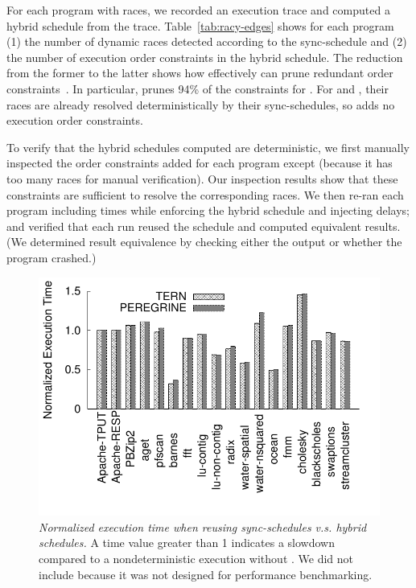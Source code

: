 For each program with races, we recorded an execution trace and computed a
hybrid schedule from the trace.  Table~\ref{tab:racy-edges} shows for each
program (1) the number of dynamic races detected according to the
sync-schedule and (2) the number of execution order constraints in the
hybrid schedule.  The reduction from the former to the latter shows how
effectively \peregrine can prune redundant order constraints~\cite{peregrine:sosp11}.
In particular, \peregrine prunes 94\% of the constraints
for \racey.  For \apache and
\streamcluster, their races are already resolved deterministically by
their sync-schedules, so \peregrine adds no execution order
constraints.

To verify that the hybrid schedules \peregrine computed are deterministic, we
first manually inspected the order constraints \peregrine added for each program
except \racey (because it has too many races for manual verification).  Our
inspection results show that these constraints are sufficient to resolve
the corresponding races.  We then re-ran each program including 
times while enforcing the hybrid schedule and injecting delays; 
and verified that each run reused the schedule and computed equivalent results.
(We determined result equivalence by checking either the output or whether
the program crashed.)

\begin{figure}[t]
\centering
\includegraphics[width=0.7\columnwidth]{peregrine/figures/overhead}
\caption{{\em Normalized execution time when reusing sync-schedules
    v.s. hybrid schedules.}  A time value greater than 1
  indicates a slowdown compared to a nondeterministic execution without
  \peregrine.  We did not include \racey because it was not designed for
  performance benchmarking. } \label{fig:peregrine-overhead}
\end{figure}

